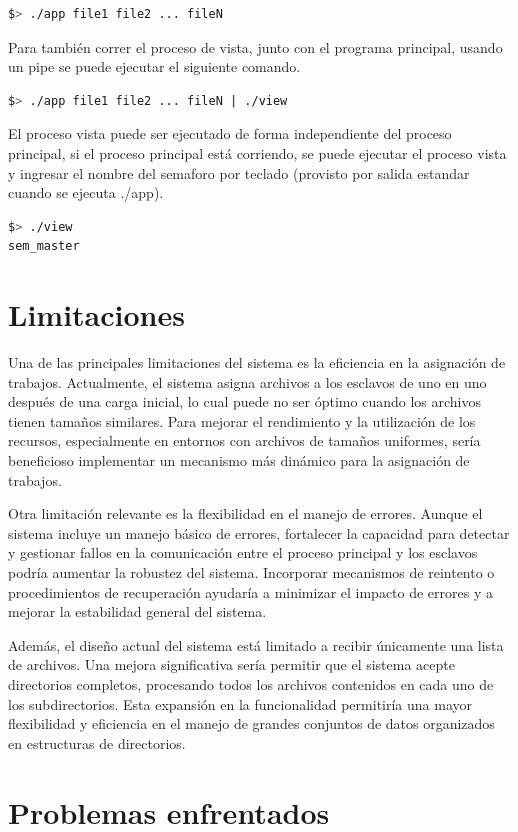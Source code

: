 \documentclass{article}
\begin{document}
\begin{lstlisting}[language=bash]
$> ./app file1 file2 ... fileN
\end{lstlisting}
Para también correr el proceso de vista, junto con el programa principal, usando un pipe se puede ejecutar el siguiente comando.
\begin{lstlisting}[language=bash]
$> ./app file1 file2 ... fileN | ./view
\end{lstlisting}
El proceso vista puede ser ejecutado de forma independiente del proceso principal, si el proceso principal está corriendo, se puede ejecutar el proceso vista y ingresar el nombre del semaforo  por teclado (provisto por salida estandar cuando se ejecuta ./app).
\begin{lstlisting}[language=bash]
$> ./view
sem_master
\end{lstlisting}

\section{Limitaciones}

Una de las principales limitaciones del sistema es la eficiencia en la asignación de trabajos. Actualmente, el sistema asigna archivos a los esclavos de uno en uno después de una carga inicial, lo cual puede no ser óptimo cuando los archivos tienen tamaños similares. Para mejorar el rendimiento y la utilización de los recursos, especialmente en entornos con archivos de tamaños uniformes, sería beneficioso implementar un mecanismo más dinámico para la asignación de trabajos.

Otra limitación relevante es la flexibilidad en el manejo de errores. Aunque el sistema incluye un manejo básico de errores, fortalecer la capacidad para detectar y gestionar fallos en la comunicación entre el proceso principal y los esclavos podría aumentar la robustez del sistema. Incorporar mecanismos de reintento o procedimientos de recuperación ayudaría a minimizar el impacto de errores y a mejorar la estabilidad general del sistema.

Además, el diseño actual del sistema está limitado a recibir únicamente una lista de archivos. Una mejora significativa sería permitir que el sistema acepte directorios completos, procesando todos los archivos contenidos en cada uno de los subdirectorios. Esta expansión en la funcionalidad permitiría una mayor flexibilidad y eficiencia en el manejo de grandes conjuntos de datos organizados en estructuras de directorios.

\section{Problemas enfrentados}
\end{document}
